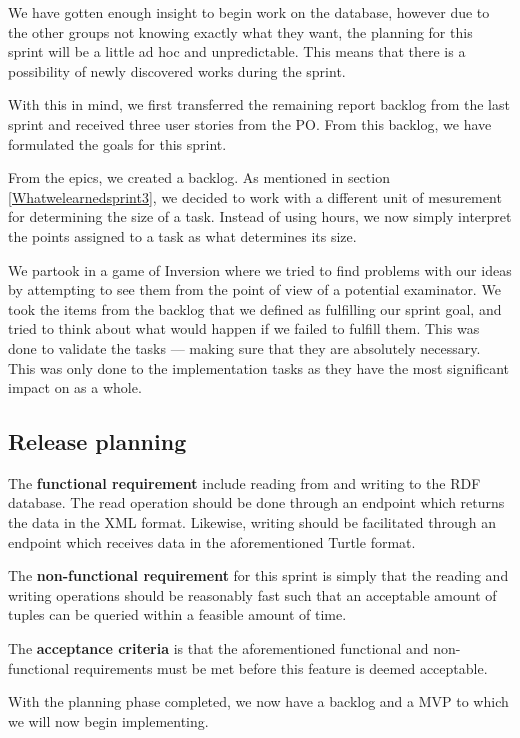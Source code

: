 We have gotten enough insight to begin work on the database, however due to the other groups not knowing exactly what they want, the planning for this sprint will be a little ad hoc and unpredictable.  
This means that there is a possibility of newly discovered works during the sprint.

With this in mind, we first transferred the remaining report backlog from the last sprint and received three user stories from the PO. 
From this backlog, we have formulated the goals for this sprint.

From the epics, we created a backlog. As mentioned in section \ref{Whatwelearnedsprint3}, we decided to work with a different unit of mesurement for determining the size of a task.
Instead of using hours, we now simply interpret the points assigned to a task as what determines its size.

We partook in a game of Inversion \cite{InversionThinking} where we tried to find problems with our ideas by attempting to see them from the point of view of a potential examinator. 
We took the items from the backlog that we defined as fulfilling our sprint goal, and tried to think about what would happen if we failed to fulfill them. 
This was done to validate the tasks — making sure that they are absolutely necessary. 
This was only done to the implementation tasks as they have the most significant impact on \knox{} as a whole.

\subsection*{Release planning}
The \textbf{functional requirement} include reading from and writing to the RDF database. 
The read operation should be done through an endpoint which returns the data in the XML format.
Likewise, writing should be facilitated through an endpoint which receives data in the aforementioned Turtle format.


The \textbf{non-functional requirement} for this sprint is simply that the reading and writing operations should be reasonably fast such that an acceptable amount of tuples can be queried within a feasible amount of time.


The \textbf{acceptance criteria} is that the aforementioned functional and non-functional requirements must be met before this feature is deemed acceptable. 


With the planning phase completed, we now have a backlog and a MVP to which we will now begin implementing.